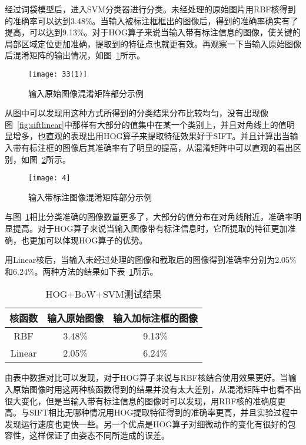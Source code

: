 经过词袋模型后，进入SVM分类器进行分类。未经处理的原始图片用RBF核得到的准确率可以达到3.48\%。当输入被标注框框出的图像后，得到的准确率确实有了提高，可以达到9.13\%。对于HOG算子来说当输入带有标注信息的图像，使关键的局部区域定位更加准确，提取到的特征点也就更有效。再观察一下当输入原始图像后混淆矩阵的输出情况，如图~\ref{fig:hogrbf}所示。
\begin{figure}[H] %
  \centering
  \texttt{[image: 33(1)]}
  \caption{输入原始图像混淆矩阵部分示例}
  \label{fig:hogrbf}
\end{figure}
从图中可以发现用这种方式所得到的分类结果分布比较均匀，没有出现像图~\ref{fig:siftlinear}中那样有大部分的值集中在某一个类别上，并且对角线上的值明显增多，也直观的表现出用HOG算子来提取特征效果好于SIFT。并且计算出当输入带有标注框的图像后其准确率有了明显的提高，从混淆矩阵中可以直观的看出区别，如图~\ref{fig:hogjiequrbf}所示。
\begin{figure}[H] %
  \centering
  \texttt{[image: 4]}
  \caption{输入带标注图像混淆矩阵部分示例}
  \label{fig:hogjiequrbf}
\end{figure}
与图~\ref{fig:hogrbf}相比分类准确的图像数量更多了，大部分的值分布在对角线附近，准确率明显提高。对于HOG算子来说当输入图像带有标注信息时，它所提取的特征更加准确，也更加可以体现HOG算子的优势。

用Linear核后，当输入未经过处理的图像和截取后的图像得到准确率分别为2.05\%和6.24\%。两种方法的结果如下表~\ref{tab:hogbowsvm}所示。

\begin{table}[htb]
 \centering
  \begin{minipage}[t]{0.6\linewidth} %
  \caption{HOG+BoW+SVM测试结果}
  \label{tab:hogbowsvm}
   \begin{tabularx}{\linewidth}{c|c|c}
     \toprule[1.5pt]
      核函数 &  输入原始图像  &  输入加标注框的图像\\
     \hline
      RBF & 3.48\% & 9.13\%  \\\hline
      Linear & 2.05\% & 6.24\%  \\
      \bottomrule[1.5pt]
    \end{tabularx}
  \end{minipage}
\end{table}

由表中数据对比可以发现，对于HOG算子来说与RBF核结合使用效果更好。当输入原始图像时用这两种核函数得到的结果并没有太大差别，从混淆矩阵中也看不出很大变化，但是当输入带有标注信息的图像时可以发现，用RBF核的准确度更高。与SIFT相比无哪种情况用HOG提取特征得到的准确率更高，并且实验过程中发现运行速度也更快一些。另一个优点是HOG算子对细微动作的变化有很好的包容性，这样保证了由姿态不同所造成的误差。

